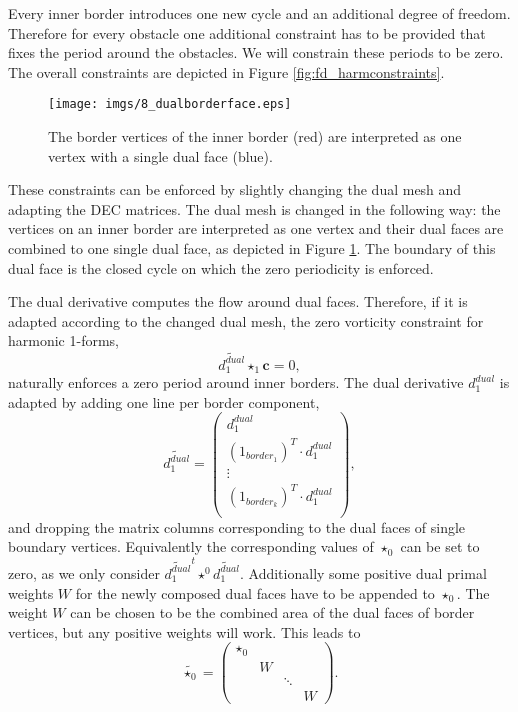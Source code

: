 Every inner border introduces one new cycle and an additional degree of freedom. Therefore for every obstacle one additional constraint has to be provided that fixes the period around the obstacles. We will constrain these periods to be zero. The overall constraints are depicted in Figure \ref{fig:fd_harmconstraints}.


\begin{figure}%
\begin{center}
\texttt{[image: imgs/8\_dualborderface.eps]}%
\end{center}
\caption{The border vertices of the inner border (red) are interpreted as one vertex with a single dual face (blue).}%
\label{fig:fd_dualborderface}%
\end{figure}

These constraints can be enforced by slightly changing the dual mesh and adapting the DEC matrices. The dual mesh is changed in the following way: the vertices on an inner border are interpreted as one vertex and their dual faces are combined to one single dual face, as depicted in Figure \ref{fig:fd_dualborderface}. The boundary of this dual face is the closed cycle on which the zero periodicity is enforced. 

The dual derivative computes the flow around dual faces. Therefore, if it is adapted according to the changed dual mesh, the zero vorticity constraint for harmonic 1-forms,
\[\widetilde{d^{dual}_1} \star_1 \textbf{c} =0,\]
naturally enforces a zero period around inner borders. The dual derivative $d_1^{dual}$ is adapted by adding one line per border component,
\[\widetilde{d_1^{dual}} = \begin{pmatrix} d_1^{dual} \\
(1_{border_1})^T \cdot d_1^{dual} \\
\vdots \\
(1_{border_k})^T \cdot d_1^{dual} \\
\end{pmatrix},\]
and dropping the matrix columns corresponding to the dual faces of single boundary vertices. Equivalently the corresponding values of $\star_0$ can be set to zero, as we only consider $\widetilde{d_1^{dual}}^t\star^0 \widetilde{d_1^{dual}}$.
Additionally some positive dual primal weights $W$ for the newly composed dual faces have to be appended to $\star_0$. The weight $W$ can be chosen to be the combined area of the dual faces of border vertices, but any positive weights will work. This leads to
\[\widetilde{\star_0} = \begin{pmatrix}\star_0& & &\\
&W& &\\
& &\ddots &\\
& & & W \end{pmatrix}.\]


